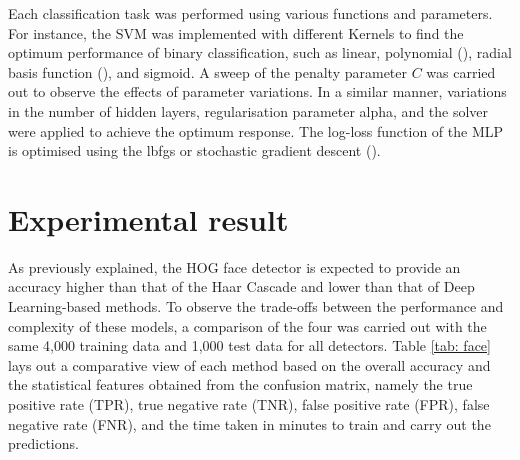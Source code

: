 \documentclass[conference]{IEEEtran}
\begin{document}
Each classification task was performed using various functions and parameters. For instance, the SVM was implemented with different Kernels to find the optimum performance of binary classification, such as linear, polynomial (), radial basis function (), and sigmoid. A sweep of the penalty parameter $C$ was carried out to observe the effects of parameter variations.
In a similar manner, variations in the number of hidden layers, regularisation parameter alpha, and the solver were applied to achieve the optimum response. The log-loss function of the MLP is optimised using the lbfgs or stochastic gradient descent ().



\section{Experimental result} \label{s-exp-res}


As previously explained, the HOG face detector is expected to provide an accuracy higher than that of the Haar Cascade and lower than that of Deep Learning-based methods. To observe the trade-offs between the performance and complexity of these models, a comparison of the four was carried out with the same 4,000 training data and 1,000 test data for all detectors. Table \ref{tab: face} lays out a comparative view of each method based on the overall accuracy and the statistical features obtained from the confusion matrix, namely the true positive rate (TPR), true negative rate (TNR), false positive rate (FPR), false negative rate (FNR), and the time taken in minutes to train and carry out the predictions.
\end{document}

